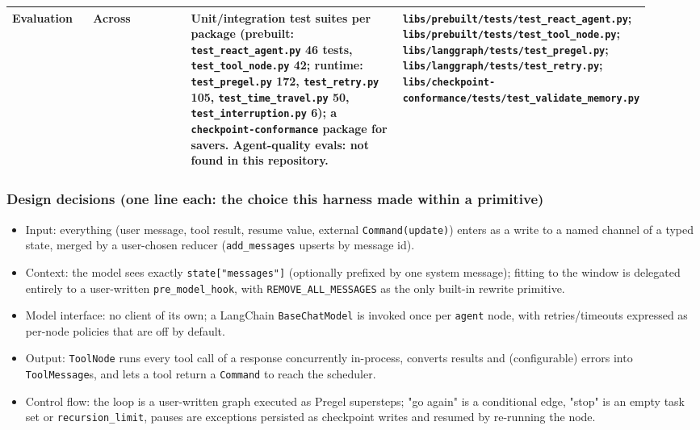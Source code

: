 \begin{longtable}{@{}p{0.13\linewidth}p{0.17\linewidth}p{0.36\linewidth}p{0.26\linewidth}@{}}
Evaluation & Across & Unit/integration test suites per package (prebuilt: \texttt{test\_\allowbreak{}react\_\allowbreak{}agent.\allowbreak{}py} 46 tests, \texttt{test\_\allowbreak{}tool\_\allowbreak{}node.\allowbreak{}py} 42; runtime: \texttt{test\_\allowbreak{}pregel.\allowbreak{}py} 172, \texttt{test\_\allowbreak{}retry.\allowbreak{}py} 105, \texttt{test\_\allowbreak{}time\_\allowbreak{}travel.\allowbreak{}py} 50, \texttt{test\_\allowbreak{}interruption.\allowbreak{}py} 6); a \texttt{checkpoint-\allowbreak{}conformance} package for savers. Agent-quality evals: not found in this repository. & \texttt{libs/\allowbreak{}prebuilt/\allowbreak{}tests/\allowbreak{}test\_\allowbreak{}react\_\allowbreak{}agent.\allowbreak{}py}; \texttt{libs/\allowbreak{}prebuilt/\allowbreak{}tests/\allowbreak{}test\_\allowbreak{}tool\_\allowbreak{}node.\allowbreak{}py}; \texttt{libs/\allowbreak{}langgraph/\allowbreak{}tests/\allowbreak{}test\_\allowbreak{}pregel.\allowbreak{}py}; \texttt{libs/\allowbreak{}langgraph/\allowbreak{}tests/\allowbreak{}test\_\allowbreak{}retry.\allowbreak{}py}; \texttt{libs/\allowbreak{}checkpoint-\allowbreak{}conformance/\allowbreak{}tests/\allowbreak{}test\_\allowbreak{}validate\_\allowbreak{}memory.\allowbreak{}py} \\
\bottomrule \end{longtable}

\subsubsection*{Design decisions (one line each: the choice this harness made within a primitive)}
\begin{itemize}
\item Input: everything (user message, tool result, resume value, external \texttt{Command(\allowbreak{}update)}) enters as a write to a named channel of a typed state, merged by a user-chosen reducer (\texttt{add\_\allowbreak{}messages} upserts by message id).
\item Context: the model sees exactly \texttt{state["messages"]} (optionally prefixed by one system message); fitting to the window is delegated entirely to a user-written \texttt{pre\_\allowbreak{}model\_\allowbreak{}hook}, with \texttt{REMOVE\_\allowbreak{}ALL\_\allowbreak{}MESSAGES} as the only built-in rewrite primitive.
\item Model interface: no client of its own; a LangChain \texttt{BaseChatModel} is invoked once per \texttt{agent} node, with retries/timeouts expressed as per-node policies that are off by default.
\item Output: \texttt{ToolNode} runs every tool call of a response concurrently in-process, converts results and (configurable) errors into \texttt{ToolMessage}s, and lets a tool return a \texttt{Command} to reach the scheduler.
\item Control flow: the loop is a user-written graph executed as Pregel supersteps; "go again" is a conditional edge, "stop" is an empty task set or \texttt{recursion\_\allowbreak{}limit}, pauses are exceptions persisted as checkpoint writes and resumed by re-running the node.
\end{itemize}

